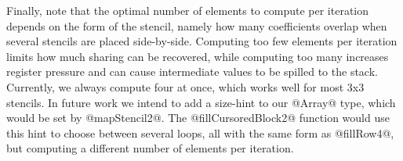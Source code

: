 Finally, note that the optimal number of elements to compute per iteration depends on the form of the stencil, namely how many coefficients overlap when several stencils are placed side-by-side. Computing too few elements per iteration limits how much sharing can be recovered, while computing too many increases register pressure and can cause intermediate values to be spilled to the stack. Currently, we always compute four at once, which works well for most 3x3 stencils. In future work we intend to add a size-hint to our @Array@ type, which would be set by @mapStencil2@. The @fillCursoredBlock2@ function would use this hint to choose between several loops, all with the same form as @fillRow4@, but computing a different number of elements per iteration.



\newcommand{\asm}[3]	
{		& \hspace{-2em} {\tt #1:} 
		& \hspace{-2em} {\tt #2} 
		& \hspace{-1em} {\tt #3} \\}

\newcommand{\aasm}[4]
{\hspace{-1em} #1 \hspace{-3em}  
		& \hspace{-2em} {\tt #2:}
		& \hspace{-2em} {\tt #3}
		& \hspace{-1em} {\tt #4} \\}

\newcommand{\lasm}[3]	{ \aasm{$\bullet$}	{#1}{#2}{#3} }
\newcommand{\sasm}[3]	{ \aasm{$\diamond$}	{#1}{#2}{#3} }


